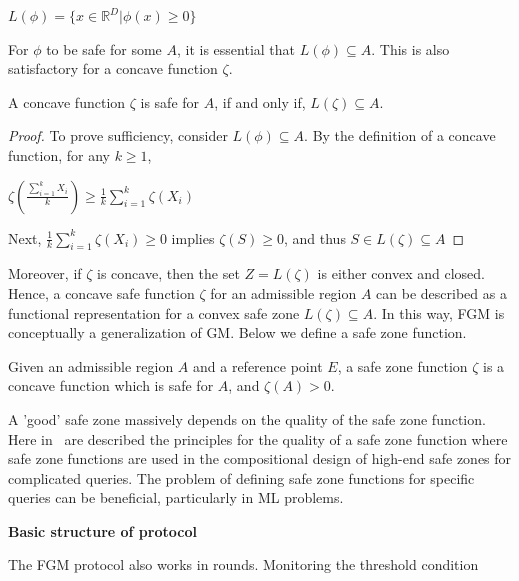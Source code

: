 \begin{center}
    $L(\phi) = \{x \in \mathbb{R}^D | \phi(x) \geq 0\}$
\end{center}

For $\phi$ to be safe for some $A$, it is essential that $L(\phi) \subseteq A$.
This is also satisfactory for a concave function $\zeta$.



\begin{prop}
    A concave function $\zeta$ is safe for $A$, if and only if, $L(\zeta) \subseteq A$.
\end{prop}
\begin{proof}
    To prove sufficiency, consider $L(\phi) \subseteq A$.
    By the definition of a concave function, for any $k \geq 1$,
    \begin{center}
        $\zeta\left(\frac{\sum_{i=1}^{k} X_i}{k}\right) \geq \frac{1}{k} \sum_{i=1}^{k} \zeta(X_i)$
    \end{center}
    Next, $\frac{1}{k} \sum_{i=1}^{k} \zeta(X_i) \geq 0$ implies $\zeta(S) \geq 0$, and thus $S \in L(\zeta) \subseteq A$
\end{proof}

Moreover, if $\zeta$ is concave, then the set $Z = L(\zeta)$ is either convex and closed.
Hence, a concave safe function $\zeta$ for an admissible region $A$ can be described as a functional representation for a convex safe zone $L(\zeta) \subseteq A$.
In this way, FGM is conceptually a generalization of GM\@.
Below we define a safe zone function.

\begin{definition}
    Given an admissible region $A$ and a reference point $E$, a safe zone function $\zeta$ is a concave function which is safe for $A$, and $\zeta(A) > 0$.
\end{definition}

A 'good' safe zone massively depends on the quality of the safe zone function.
Here in~\cite{garofalakis_distributed_nodate} are described the principles for the quality of a safe zone function
where safe zone functions are used in the compositional design of high-end safe zones for complicated queries.
The problem of defining safe zone functions for specific queries can be beneficial, particularly in ML problems.


{\large \textbf{Basic structure of protocol}}

The FGM protocol also works in rounds.
Monitoring the threshold condition

